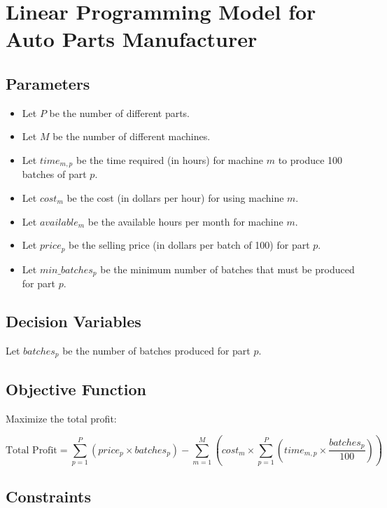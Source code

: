 \documentclass{article}
\begin{document}
\section*{Linear Programming Model for Auto Parts Manufacturer}

\subsection*{Parameters}

\begin{itemize}
    \item Let \( P \) be the number of different parts.
    \item Let \( M \) be the number of different machines.
    \item Let \( time_{m,p} \) be the time required (in hours) for machine \( m \) to produce 100 batches of part \( p \).
    \item Let \( cost_{m} \) be the cost (in dollars per hour) for using machine \( m \).
    \item Let \( available_{m} \) be the available hours per month for machine \( m \).
    \item Let \( price_{p} \) be the selling price (in dollars per batch of 100) for part \( p \).
    \item Let \( min\_batches_{p} \) be the minimum number of batches that must be produced for part \( p \).
\end{itemize}

\subsection*{Decision Variables}

Let \( batches_{p} \) be the number of batches produced for part \( p \).

\subsection*{Objective Function}

Maximize the total profit:

\[
\text{Total Profit} = \sum_{p=1}^{P} (price_{p} \times batches_{p}) - \sum_{m=1}^{M} \left( cost_{m} \times \sum_{p=1}^{P} (time_{m,p} \times \frac{batches_{p}}{100}) \right)
\]

\subsection*{Constraints}

\end{document}
